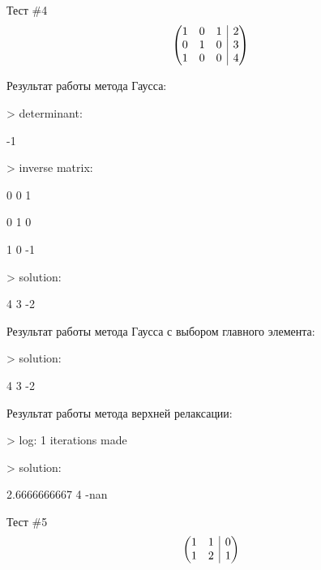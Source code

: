 \documentclass[12pt, a4paper]{report}
\makeatletter
\newenvironment{amatrix}[1]{%
        \left(\begin{array}{@{}*{#1}{c}|c@{}}
}{%
        \end{array}\right)
}
\makeatother
\begin{document}
{%
\large{Тест \#4}
\[\begin{amatrix}{3}
        1 & 0 & 1 & 2 \\
        0 & 1 & 0 & 3 \\
        1 & 0 & 0 & 4 \\
\end{amatrix}\]

\normalsize{Результат работы метода Гаусса: \par}
\normalsize{> determinant: \par
            -1 \par
            > inverse matrix: \par
                         0               0               1 \par
                         0               1               0 \par
                         1               0              -1 \par
            > solution: \par
                         4               3              -2 \par}

\vspace{0.25cm}
\normalsize{Результат работы метода Гаусса с выбором главного элемента: \par}
\normalsize{> solution: \par
            4               3              -2 \par}
\vspace{0.25cm}
\normalsize{Результат работы метода верхней релаксации: \par}
\normalsize{> log: 1 iterations made \par
            > solution: \par
            2.6666666667    4              -nan \par}
\vspace{1cm}

\large{Тест \#5}
\[\begin{amatrix}{2}
        1 & 1 & 0 \\
        1 & 2 & 1 \\
\end{amatrix}\]

}
\end{document}
